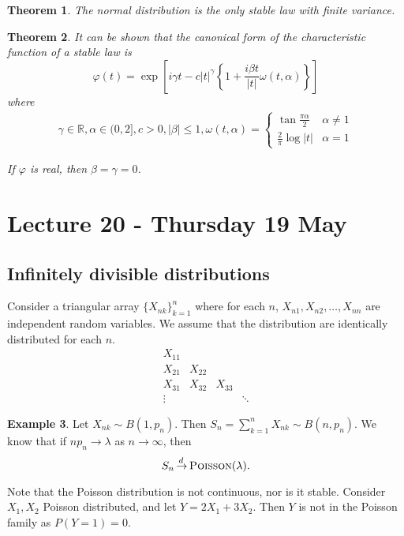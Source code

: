 \documentclass[10pt, oneside, reqno]{amsart}
\theoremstyle{plain}%
\newtheorem{thm}{Theorem}[section]
\theoremstyle{definition}
\newtheorem{exmp}[thm]{Example}
\theoremstyle{remark}
\renewcommand{\phi}{\varphi}
\newcommand{\R}{\mathbb{R}}
\def\cid{\,{\buildrel \!d \over \rightarrow}\,}
\begin{document}
\begin{thm}
	The normal distribution is the only stable law with finite variance.
\end{thm}

\begin{thm}
	It can be shown that the canonical form of the characteristic function of a stable law is \[
		\phi(t) = \exp\left[ i \gamma t - c|t|^\gamma \left\{ 1 + \frac{i \beta t}{|t|} \omega(t, \alpha)\right\}\right]
	\]  where \begin{align*}
		\gamma \in \R, \alpha \in (0, 2], c > 0, |\beta | \leq 1, \omega(t, \alpha) = \begin{cases}
			\tan \frac{\pi \alpha}{2} & \alpha \neq 1 \\
			\frac{2}{\pi} \log |t|	&\alpha = 1
		\end{cases}
	\end{align*}
	
	If $\phi$ is real, then $\beta = \gamma = 0$. 
\end{thm}

\section{Lecture 20 - Thursday 19 May} %
\label{sec:lecture_20_thursday_19_may}
\subsection{Infinitely divisible distributions} %
\label{sub:infinitely_divisible_distributions}

Consider a triangular array $\{ X_{nk} \}_{k=1}^n$ where for each $n$, $X_{n1}, X_{n2}, \dots, X_{nn}$ are independent random variables.  We assume that the distribution are identically distributed for each $n$.\[  \begin{matrix}
	X_{11} &  		& \\
	X_{21} & X_{22} &	\\
	X_{31} & X_{32} & X_{33} \\
	\vdots &		& 		&\ddots
\end{matrix}
\]

\begin{exmp}
	Let $X_{nk} \sim B(1, p_n)$.  Then $S_n = \sum_{k=1}^n X_{nk} \sim B(n , p_n)$.  We know that if $n p_n \rightarrow \lambda$ as $n \rightarrow \infty$, then \[
		S_n \cid \textsc{Poisson}(\lambda).
	\]
	
	Note that the Poisson distribution is not continuous, nor is it stable.  Consider $X_1, X_2$ Poisson distributed, and let $Y = 2X_1 + 3X_2$.  Then $Y$ is not in the Poisson family as $P(Y = 1) = 0$.  
\end{exmp}
\end{document}
